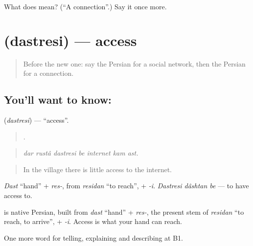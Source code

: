 \begin{tcolorbox}[breakable,colback=teal!4,colframe=teal!35!black,title={Before you move on}]
What does  mean? (\textquotedblleft{}A connection\textquotedblright{}.) Say it once more.
\end{tcolorbox}
\section[\texorpdfstring{\fa{دسترسی} (dastresi)}{دسترسی (dastresi)}]{ (dastresi) — access}

\label{lesson:FA-C417-dastresi}



\begin{quote}
Before the new one: say the Persian for a social network, then the Persian for a connection.
\end{quote}

\subsection*{You'll want to know: }
\textbf{} (\emph{dastresi}) — \textquotedblleft{}access\textquotedblright{}.

\begin{quote}
      .
\end{quote}

\begin{quote}
\emph{dar rustâ dastresi be internet kam ast.}
\end{quote}

\begin{quote}
In the village there is little access to the internet.
\end{quote}

\emph{Dast} \textquotedblleft{}hand\textquotedblright{} + \emph{res-}, from \emph{residan} \textquotedblleft{}to reach\textquotedblright{}, + \emph{-i}. \emph{Dastresi dâshtan be} — to have access to.

\begin{cousinweb}
\textbf{} is native Persian, built from \emph{dast} \textquotedblleft{}hand\textquotedblright{} + \emph{res-}, the present stem of \emph{residan} \textquotedblleft{}to reach, to arrive\textquotedblright{}, + \emph{-i}. Access is what your hand can reach.
\end{cousinweb}

\begin{grammarlens}[title={What you've built}]
One more word for telling, explaining and describing at B1.
\end{grammarlens}

